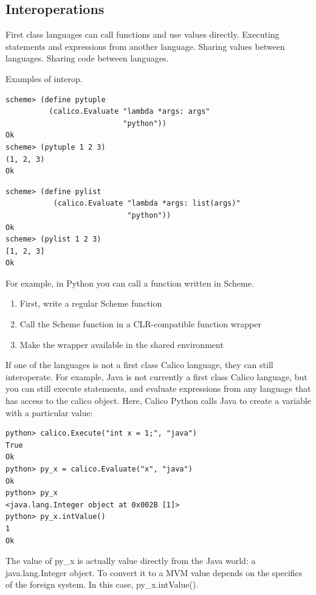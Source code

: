 \documentclass[preprint]{sigplanconf}
\begin{document}
\subsection{Interoperations}

First class languages can call functions and use values
directly. Executing statements and expressions from another language.
Sharing values between languages.  Sharing code between languages.

Examples of interop.

\begin{verbatim}
scheme> (define pytuple 
          (calico.Evaluate "lambda *args: args" 
                           "python"))
Ok
scheme> (pytuple 1 2 3)
(1, 2, 3)
Ok
\end{verbatim}


\begin{verbatim}
scheme> (define pylist 
           (calico.Evaluate "lambda *args: list(args)" 
                            "python"))
Ok
scheme> (pylist 1 2 3)
[1, 2, 3]
Ok
\end{verbatim}

For example, in Python you can call a function written in Scheme.

\begin{enumerate}
\item First, write a regular Scheme function
\item Call the Scheme function in a CLR-compatible function wrapper
\item Make the wrapper available in the shared environment
\end{enumerate}

If one of the languages is not a first class Calico language, they can
still interoperate. For example, Java is not currently a first class
Calico language, but you can still execute statements, and evaluate
expressions from any language that has access to the calico
object. Here, Calico Python calls Java to create a variable with a
particular value:

\begin{verbatim}
python> calico.Execute("int x = 1;", "java")
True
Ok
python> py_x = calico.Evaluate("x", "java")
Ok
python> py_x
<java.lang.Integer object at 0x002B [1]>
python> py_x.intValue()
1
Ok
\end{verbatim}

The value of py\_x is actually value directly from the Java world: a
java.lang.Integer object. To convert it to a MVM value depends on the
specifics of the foreign system. In this case, py\_x.intValue().
\end{document}
